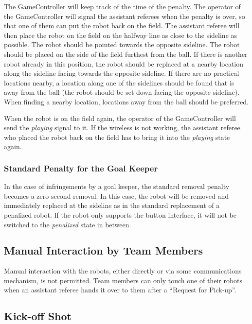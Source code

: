 \documentclass[12pt]{article}
\begin{document}
The GameController will keep track of the time of the penalty. The operator of the GameController will signal the assistant referees when the penalty is over, so that one of them can put the robot back on the field. The assistant referee will then place the robot on the field on the halfway line as close to the sideline as possible. The robot should be pointed towards the opposite sideline. The robot should be placed on the side of the field furthest from the ball. If there is another robot already in this position, the robot should be replaced at a nearby location along the sideline facing towards the opposite sideline. If there are no practical locations nearby, a location along one of the sidelines should be found that is away from the ball (the robot should be set down facing the opposite sideline). When finding a nearby location, locations away from the ball should be preferred.

When the robot is on the field again, the operator of the GameController will send the \emph{playing} signal to it. If the wireless is not working, the assistant referee who placed the robot back on the field has to bring it into the \emph{playing} state again.

\subsubsection{Standard Penalty for the Goal Keeper}
\label{sec:goal_keeper_standard_penalty}

In the case of infringements by a goal keeper, the standard removal penalty becomes a zero second removal. In this case, the robot will be removed and immediately replaced at the sideline as in the standard replacement of a penalized robot. If the robot only supports the button interface, it will not be switched to the \emph{penalized} state in between.

\subsection{Manual Interaction by Team Members}

Manual interaction with the robots, either directly or via some communications mechanism, is not permitted. Team members can only touch one of their robots when an assistant referee hands it over to them after a ``Request for Pick-up''.

\subsection{Kick-off Shot}
\label{sec:kick-off_shot}
\end{document}

